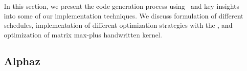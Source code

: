  In this section, we present the code generation process using \alphaz\ and key insights into some of our implementation techniques. We discuss formulation of different schedules, implementation of different optimization strategies with the \alphaz, and optimization of matrix max-plus handwritten kernel. 
\subsection{Alphaz}\label{sec:alphaz}


